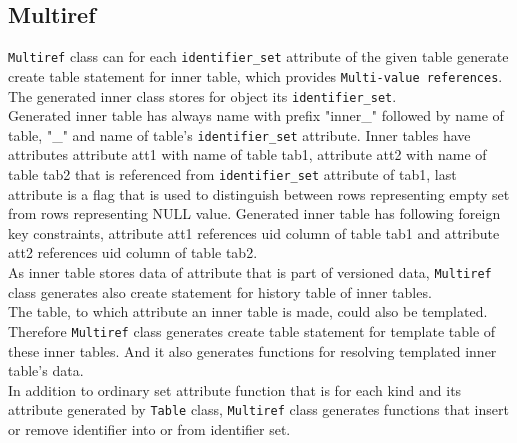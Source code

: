 \documentclass[deska]{subfiles}
\begin{document}
\subsection{Multiref}
{\tt Multiref} class can for each {\tt identifier\_set} attribute of the given table generate create table statement for inner table, which provides {\tt Multi-value references}. The generated inner class stores for object its {\tt identifier\_set}.\\
Generated inner table has always name with prefix "inner\_" followed by name of table, "\_" and name of table's {\tt identifier\_set} attribute. Inner tables have attributes attribute att1 with name of table tab1, attribute att2 with name of table tab2 that is referenced from {\tt identifier\_set} attribute of tab1, last attribute is a flag that is used to distinguish between rows representing empty set from rows representing NULL value. Generated inner table has following foreign key constraints, attribute att1 references uid column of table tab1 and attribute att2 references uid column of table tab2.\\
As inner table stores data of attribute that is part of versioned data, {\tt Multiref} class generates also create statement for history table of inner tables.\\ 
The table, to which attribute an inner table is made, could also be templated. Therefore {\tt Multiref} class generates create table statement for template table of these inner tables. And it also generates functions for resolving templated inner table's data.\\
In addition to ordinary set attribute function that is for each kind and its attribute generated by {\tt Table} class, {\tt Multiref} class generates functions that insert or remove identifier into or from identifier set.
\end{document}
